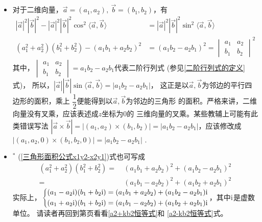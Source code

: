 \begin{itemize}[leftmargin=\inteval{\myitemleftmargin}pt,itemsep=
   \inteval{\myitemitempsep}pt,topsep=\inteval{\myitemtopsep}pt]
\item 对于二维向量，$ \vec{a}=(a_1,a_2),\ \vec{b}=(b_1,b_2) $，有
\renewcommand{\arraystretch}{0.7}
\begin{align}
    |\vec{a}|^2|\vec{b}|^2-|\vec{a}|^2|\vec{b}|^2
    \cos^2\langle\vec{a},\vec{b}\rangle 
    &=|\vec{a}|^2|\vec{b}|^2\sin^2\langle\vec{a},\vec{b}\rangle \nonumber\\
    (a_1^2+a_2^2)(b_1^2+b_2^2)-(a_1b_1+a_2b_2)^2 &=
    (a_1b_2-a_2b_1)^2=
    \begin{vmatrix}
        a_{1} & a_{2} \\
        b_{1} & b_{2}
    \end{vmatrix}
    ^2 \label{三角形面积公式x1y2-x2y1}
\end{align}
其中，$ \begin{vmatrix}
    a_{1} & a_{2} \\
    b_{1} & b_{2}
\end{vmatrix}=a_1b_2-a_2b_1 $代表二阶行列式
(参见\eqref{二阶行列式的定义}式)，
所以，$ |\vec{a}||\vec{b}|\sin\langle\vec{a},\vec{b}
\rangle=|a_1b_2-a_2b_1| $，
这正是以$ \vec{a},\vec{b} $为邻边的平行四边形的面积，乘上
$ \dfrac{1}{2} $便能得到以$ \vec{a},\vec{b} $为邻边的三角形
的面积。严格来讲，二维向量没有叉乘，应该表述成$ z $坐标为0的
三维向量的叉乘。某些教辅上可能有此类错误写法
$ |\vec{a}\times\vec{b}|=|(a_1,a_2)\times (b_1,b_2)|=
|a_1b_2-a_2b_1| $，应该修改成
$ |(a_1,a_2,0)\times (b_1,b_2,0)|=|a_1b_2-a_2b_1| $ . 

\item $^*$ (\ref{三角形面积公式x1y2-x2y1})式也可写成
\begin{align} 
    (a_1^2+a_2^2)(b_1^2+b_2^2)=&\  (a_1b_1+a_2b_2)^2+
    (a_1b_2-a_2b_1)^2 \\
    =&\  (a_1b_1-a_2b_2)^2+(a_1b_2+a_2b_1)^2 
\end{align}
实际上，$ \begin{dcases}
   (a_1-a_2 \mathrm{i})(b_1+b_2 \mathrm{i})=(a_1b_1+a_2b_2)+(a_1b_2-a_2b_1)\mathrm{i}  \\
   (a_1+a_2 \mathrm{i})(b_1+b_2 \mathrm{i})=(a_1b_1-a_2b_2)+(a_1b_2+a_2b_1)\mathrm{i}  
\end{dcases} $，其中$ \mathrm{i} $是虚数单位。
请读者再回到第\pageref{a2+kb2恒等式}页看看\eqref{a2+kb2恒等式}和
\eqref{a2-kb2恒等式}式。


\end{itemize}

